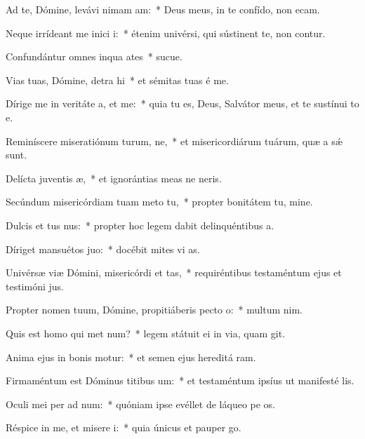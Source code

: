 \item Ad te, Dómine, levávi nimam am:~* Deus meus, in te confído, non ecam.
\item Neque irrídeant me inici i:~* étenim univérsi, qui sústinent te, non contur.
\item Confundántur omnes inqua ates~* sucue.
\item Vias tuas, Dómine, detra hi~* et sémitas tuas é me.
\item Dírige me in veritáte a, et  me:~* quia tu es, Deus, Salvátor meus, et te sustínui to e.
\item Reminíscere miseratiónum turum, ne,~* et misericordiárum tuárum, quæ a sǽ sunt.
\item Delícta juventis æ,~* et ignorántias meas ne neris.
\item Secúndum misericórdiam tuam meto  tu,~* propter bonitátem tu, mine.
\item Dulcis et tus nus:~* propter hoc legem dabit delinquéntibus  a.
\item Díriget mansuétos  juo:~* docébit mites vi as.
\item Univérsæ viæ Dómini, misericórdi et tas,~* requiréntibus testaméntum ejus et testimóni jus.
\item Propter nomen tuum, Dómine, propitiáberis pecto o:~* multum  nim.
\item Quis est homo qui met num?~* legem státuit ei in via, quam git.
\item Anima ejus in bonis motur:~* et semen ejus hereditá ram.
\item Firmaméntum est Dóminus titibus um:~* et testaméntum ipsíus ut manifesté lis.
\item Oculi mei per ad num:~* quóniam ipse evéllet de láqueo pe os.
\item Réspice in me, et misere i:~* quia únicus et pauper  go.
